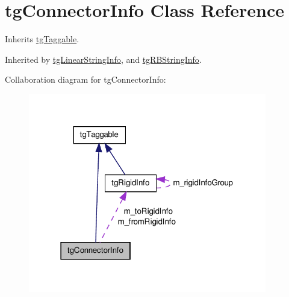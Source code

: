\hypertarget{classtg_connector_info}{\section{tg\-Connector\-Info Class Reference}
\label{classtg_connector_info}
}


Inherits \hyperlink{classtg_taggable}{tg\-Taggable}.



Inherited by \hyperlink{classtg_linear_string_info}{tg\-Linear\-String\-Info}, and \hyperlink{classtg_r_b_string_info}{tg\-R\-B\-String\-Info}.



Collaboration diagram for tg\-Connector\-Info\-:\nopagebreak
\begin{figure}[H]
\begin{center}
\leavevmode
\includegraphics[width=295pt]{classtg_connector_info__coll__graph}
\end{center}
\end{figure}
